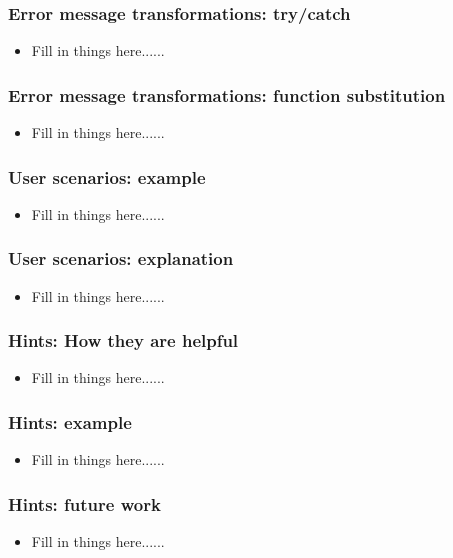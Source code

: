 \documentclass{beamer}
\begin{document}
\begin{frame}
\frametitle{Error message transformations: try/catch}
	\begin{itemize}
  	 \item Fill in things here......
	 \end{itemize}
\end{frame}

\begin{frame}
\frametitle{Error message transformations: function substitution}
	\begin{itemize}
  	 \item Fill in things here......
	 \end{itemize}
\end{frame}

\begin{frame}[fragile]
\frametitle{User scenarios: example}
	\begin{itemize}
  	 \item Fill in things here......
	 \end{itemize}
\end{frame}

\begin{frame}
\frametitle{User scenarios: explanation}
	\begin{itemize}
  	 \item Fill in things here......
	 \end{itemize}
\end{frame}

\begin{frame}
\frametitle{Hints: How they are helpful}
	\begin{itemize}
  	 \item Fill in things here......
	 \end{itemize}
\end{frame}

\begin{frame}
\frametitle{Hints: example}
	\begin{itemize}
  	 \item Fill in things here......
	 \end{itemize}
\end{frame}

\begin{frame}
\frametitle{Hints: future work}
	\begin{itemize}
  	 \item Fill in things here......
	 \end{itemize}
\end{frame}
\end{document}

